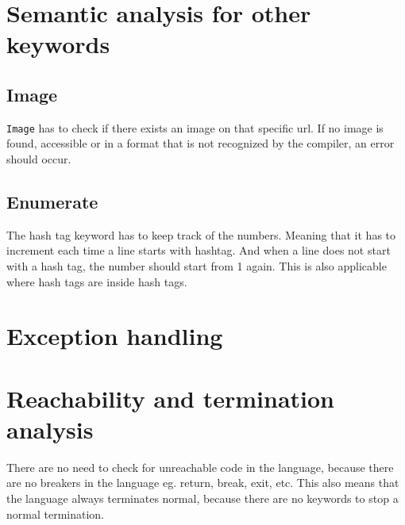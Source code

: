 \section{Semantic analysis for other keywords}
     \subsection{Image}
\texttt{Image} has to check if there exists an image on that specific url. If no image is found, accessible or in a format that is not recognized by the compiler, an error should occur.


     \subsection{Enumerate}
The hash tag keyword has to keep track of the numbers. Meaning that it has to increment each time a line starts with hashtag. And when a line does not start with a hash tag, the number should start from 1 again. This is also applicable where hash tags are inside hash tags.

\section{Exception handling}




\section{Reachability and termination analysis}
There are no need to check for unreachable code in the language, because there are no breakers in the language eg. return, break, exit, etc.
This also means that the language always terminates normal, because there are no keywords to stop a normal termination. 
